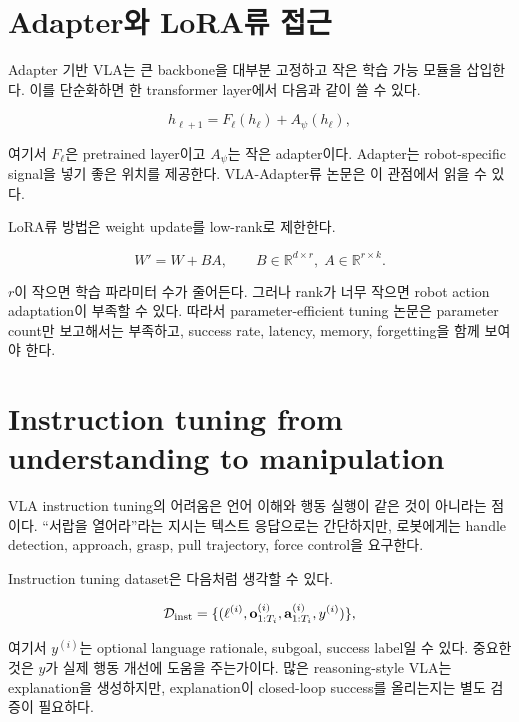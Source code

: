 \section{Adapter와 LoRA류 접근}

Adapter 기반 VLA는 큰 backbone을 대부분 고정하고 작은 학습 가능 모듈을 삽입한다. 이를 단순화하면 한 transformer layer에서 다음과 같이 쓸 수 있다.

\begin{equation}
  h_{\ell+1}
  =
  F_\ell(h_\ell)
  +
  A_\psi(h_\ell),
\end{equation}

여기서 $F_\ell$은 pretrained layer이고 $A_\psi$는 작은 adapter이다. Adapter는 robot-specific signal을 넣기 좋은 위치를 제공한다. VLA-Adapter류 논문은 이 관점에서 읽을 수 있다.

LoRA류 방법은 weight update를 low-rank로 제한한다.

\begin{equation}
  W'
  =
  W
  +
  BA,
  \qquad
  B \in \mathbb{R}^{d \times r},\;
  A \in \mathbb{R}^{r \times k}.
\end{equation}

$r$이 작으면 학습 파라미터 수가 줄어든다. 그러나 rank가 너무 작으면 robot action adaptation이 부족할 수 있다. 따라서 parameter-efficient tuning 논문은 parameter count만 보고해서는 부족하고, success rate, latency, memory, forgetting을 함께 보여야 한다.

\section{Instruction tuning from understanding to manipulation}

VLA instruction tuning의 어려움은 언어 이해와 행동 실행이 같은 것이 아니라는 점이다. ``서랍을 열어라''라는 지시는 텍스트 응답으로는 간단하지만, 로봇에게는 handle detection, approach, grasp, pull trajectory, force control을 요구한다.

Instruction tuning dataset은 다음처럼 생각할 수 있다.

\begin{equation}
  \mathcal{D}_{\mathrm{inst}}
  =
  \{(\ell^{(i)}, \mathbf{o}_{1:T_i}^{(i)}, \mathbf{a}_{1:T_i}^{(i)}, y^{(i)})\},
\end{equation}

여기서 $y^{(i)}$는 optional language rationale, subgoal, success label일 수 있다. 중요한 것은 $y$가 실제 행동 개선에 도움을 주는가이다. 많은 reasoning-style VLA는 explanation을 생성하지만, explanation이 closed-loop success를 올리는지는 별도 검증이 필요하다.

